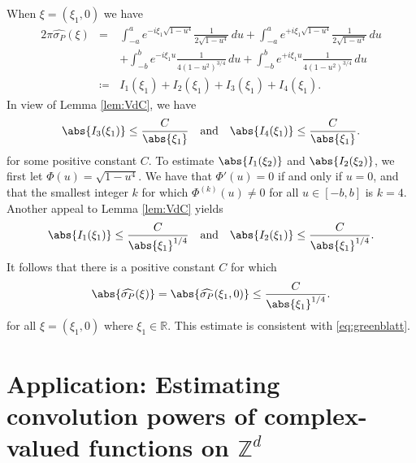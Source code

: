 \documentclass[11pt, letter]{book}
\newcommand{\f}[2]{\frac{#1}{#2}}
\begin{document}
When $\xi = (\xi_1,0)$ we have
\begin{eqnarray*}
    2\pi \widehat{\sigma_P}(\xi) 
    &=& \int_{-a}^a  e^{-i \xi_1 \sqrt{1-u^4}} \f{1}{2\sqrt{1-u^4}}\,du  + \int_{-a}^a  e^{+i \xi_1 \sqrt{1-u^4}} \f{1}{2\sqrt{1-u^4}}\,du \\
    &\quad& + \int_{-b}^b e^{-i \xi_1 u}  \f{1}{4(1 - u^2)^{3/4}} \,du + \int_{-b}^b e^{+i \xi_1 u} \f{1}{4(1 - u^2)^{3/4}}\,du \\
    &\coloneqq& I_1(\xi_1) + I_2(\xi_1) + I_3(\xi_1) + I_4(\xi_1).
\end{eqnarray*}
In view of Lemma \ref{lem:VdC}, we have
\begin{equation*}
    \abs{I_3(\xi_1)} \leq \f{C}{\abs{\xi_1}} \quad \mbox{and} \quad \abs{I_4(\xi_1)} \leq \f{C}{\abs{\xi_1}}.
\end{equation*}
for some positive constant $C$. To estimate $\abs{I_1(\xi_2)}$ and $\abs{I_2(\xi_2)}$, we first let $\Phi(u) = \sqrt{1-u^4}$. We have that $\Phi'(u) = 0$ if and only if $u=0$, and that the smallest integer $k$ for which $\Phi^{(k)}(u) \neq 0$ for all $u\in [-b,b]$ is $k=4$. Another appeal to Lemma \ref{lem:VdC} yields
\begin{equation*}
    \abs{I_1(\xi_1)} \leq \f{C}{\abs{\xi_1}^{1/4}} \quad \mbox{and} \quad \abs{I_2(\xi_1)} \leq \f{C}{\abs{\xi_1}^{1/4}}.
\end{equation*}
It follows that there is a positive constant $C$ for which
\begin{equation*}
    \abs{\widehat{\sigma_P}(\xi)}= \abs{\widehat{\sigma_P}(\xi_1,0) } \leq \f{C}{\abs{\xi_1}^{1/4}}.
\end{equation*}
for all $\xi=(\xi_1,0)$ where $\xi_1\in\mathbb{R}$. This estimate is consistent with \eqref{eq:greenblatt}.




















\chapter{Application: Estimating convolution powers of complex-valued functions on $\mathbb{Z}^d$}
\label{chap:Estimate-ConvPwr}
\end{document}
